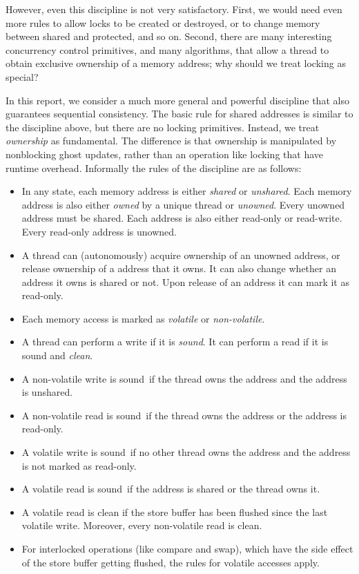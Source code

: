 \documentclass[11pt]{llncs}
\newcommand{\Sound}{sound}
\newcommand{\Def}[1]{\emph{#1}}
\begin{document}
However, even this discipline is not very satisfactory. First, we would
need even more rules to allow locks to be created or destroyed, or to
change memory between shared and protected, and so on.  Second, there
are many interesting concurrency control primitives, and many
algorithms, that allow a thread to obtain exclusive ownership of a
memory address; why should we treat locking as special? 

In this report, we consider a much more general and powerful
discipline that also guarantees sequential consistency. The basic rule
for shared addresses is similar to the discipline above, but there are
no locking primitives. Instead, we treat \Def{ownership} as
fundamental. The difference is that ownership is manipulated by
nonblocking ghost updates, rather than an operation like locking that 
have runtime overhead. Informally the rules of the discipline are as
follows:
\begin{itemize}
\item In any state, each memory address is either \Def{shared} or
  \Def{unshared}. Each memory address is also either \Def{owned} by a
  unique thread or \Def{unowned}. Every unowned address must be
  shared. Each address is also either read-only or read-write. 
  Every read-only address is unowned.
\item A thread can (autonomously) acquire ownership of an unowned
  address, or release ownership of a address that it owns. It can also
  change whether an address it owns is shared or not. Upon release of
  an address it can mark it as read-only.
\item Each memory access is marked as \Def{volatile} or
  \Def{non-volatile}. 
\item A thread can perform a write if it is \Def{\Sound}. It can
  perform a read if it is sound and \Def{clean}.
\item A non-volatile write is \Sound\ if the thread owns the address
  and the address is unshared. 
\item A non-volatile read is \Sound\ if the thread owns the address or the address is read-only.
\item A volatile write is \Sound\ if no other thread owns the address
  and the address is not marked as read-only.
\item A volatile read is \Sound\ if the address is shared or the thread owns it.
\item A volatile read is clean if the store buffer has been flushed since the
  last volatile write.  Moreover, every non-volatile read is clean.
\item For interlocked operations (like compare and swap), which have
  the side effect of the store buffer getting flushed, the rules for
  volatile accesses apply.
\end{itemize}
\end{document}
